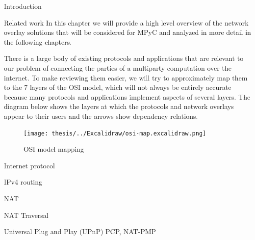 \begin{frame}
\tableofcontents

\printnoidxglossary[type=\acronymtype,title=List of Abbreviations]
\listoffigures

\mainmatter
\end{frame}

\begin{frame}{Introduction}
\protect\hypertarget{introduction}{}
\end{frame}

\begin{frame}[fragile]{Related work}
\protect\hypertarget{related-work}{}
In this chapter we will provide a high level overview of the network
overlay solutions that will be considered for MPyC and analyzed in more
detail in the following chapters.

There is a large body of existing protocols and applications that are
relevant to our problem of connecting the parties of a multiparty
computation over the internet. To make reviewing them easier, we will
try to approximately map them to the 7 layers of the OSI model, which
will not always be entirely accurate because many protocols and
applications implement aspects of several layers. The diagram below
shows the layers at which the protocols and network overlays appear to
their users and the arrows show dependency relations.

\begin{figure}
\centering
\texttt{[image: thesis/../Excalidraw/osi-map.excalidraw.png]}
\caption{OSI model mapping}
\end{figure}

\begin{block}{Internet protocol}
\protect\hypertarget{internet-protocol}{}
\begin{block}{IPv4 routing}
\protect\hypertarget{ipv4-routing}{}
\end{block}

\begin{block}{NAT}
\protect\hypertarget{nat}{}
\end{block}

\begin{block}{NAT Traversal}
\protect\hypertarget{nat-traversal}{}
\end{block}

\begin{block}{Universal Plug and Play (UPnP)}
\protect\hypertarget{universal-plug-and-play-upnp}{}
PCP, NAT-PMP
\end{block}


\end{block}
\end{frame}

